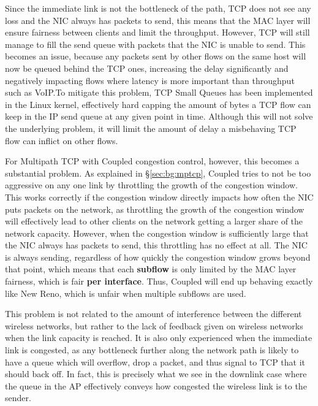 Since the immediate link is not the bottleneck of the path, TCP does not see any loss and the NIC always has packets to send, this means that the MAC layer will ensure fairness between clients and limit the throughput.
However, TCP will still manage to fill the send queue with packets that the NIC is unable to send. This becomes an issue, because any packets sent by other flows on the same host will now be queued behind the TCP ones, increasing the delay significantly and negatively impacting flows where latency is more important than throughput such as VoIP.\@ To mitigate this problem, TCP Small Queues has been implemented in the Linux kernel, effectively hard capping the amount of bytes a TCP flow can keep in the IP send queue at any given point in time. Although this will not solve the underlying problem, it will limit the amount of delay a misbehaving TCP flow can inflict on other flows.

For Multipath TCP with Coupled congestion control, however, this becomes a
substantial problem. As explained in \S\ref{sec:bg:mptcp}, Coupled tries to not be too 
aggressive on any one link by throttling the growth of the congestion window.
This works correctly if the congestion window directly impacts how often the NIC 
puts packets on the network, as throttling the growth of the congestion window 
will effectively lead to other clients on the network getting a larger share of 
the network capacity. However, when the congestion window is sufficiently large 
that the NIC always has packets to send, this throttling has no effect at all. 
The NIC is always sending, regardless of how quickly the congestion window grows 
beyond that point, which means that each \textbf{subflow} is only limited by the 
MAC layer fairness, which is fair \textbf{per interface}. Thus, Coupled will end 
up behaving exactly like New Reno, which is unfair when multiple subflows are 
used.

This problem is not related to the amount of interference between the different
wireless networks, but rather to the lack of feedback given on
wireless networks when the link capacity is reached. It is also only experienced
when the immediate link is congested, as any bottleneck further along the network
path is likely to have a queue which will overflow, drop a packet, and thus
signal to TCP that it should back off. In fact, this is precisely what we see in
the downlink case where the queue in the AP effectively conveys how congested
the wireless link is to the sender.

